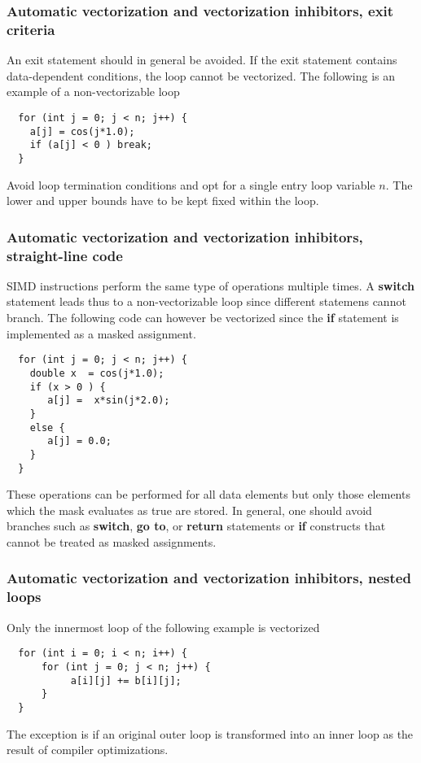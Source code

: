 \documentclass{beamer}
\begin{document}
\begin{frame}
\frametitle{Automatic vectorization and vectorization inhibitors, exit criteria}

An exit statement should in general be avoided. 
If the exit statement contains data-dependent conditions, the loop cannot be vectorized. 
The following is an example of a non-vectorizable loop
\begin{verbatim}
  for (int j = 0; j < n; j++) {
    a[j] = cos(j*1.0);
    if (a[j] < 0 ) break;
  }
\end{verbatim}
Avoid loop termination conditions and opt for a single entry loop variable $n$. The lower and upper bounds have to be kept fixed within the loop.
\end{frame}

\begin{frame}
\frametitle{Automatic vectorization and vectorization inhibitors, straight-line code}

SIMD instructions perform the same type of operations multiple times. 
A \textbf{switch} statement leads thus to a non-vectorizable loop since different statemens cannot branch.
The following code can however be vectorized since the \textbf{if} statement is implemented as a masked assignment.
\begin{verbatim}
  for (int j = 0; j < n; j++) {
    double x  = cos(j*1.0);
    if (x > 0 ) {
       a[j] =  x*sin(j*2.0); 
    }
    else {
       a[j] = 0.0;
    }
  }
\end{verbatim}
These operations can be performed for all data elements but only those elements which the mask evaluates as true are stored. In general, one should avoid branches such as \textbf{switch}, \textbf{go to}, or \textbf{return} statements or \textbf{if} constructs that cannot be treated as masked assignments.
\end{frame}

\begin{frame}
\frametitle{Automatic vectorization and vectorization inhibitors, nested loops}

Only the innermost loop of the following example is vectorized
\begin{verbatim}
  for (int i = 0; i < n; i++) {
      for (int j = 0; j < n; j++) {
           a[i][j] += b[i][j];
      }  
  }
\end{verbatim}
The exception is if an original outer loop is transformed into an inner loop as the result of compiler optimizations.
\end{frame}
\end{document}
